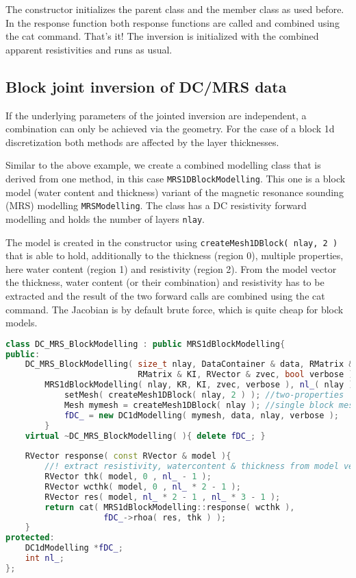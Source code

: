 The constructor initializes the parent class and the member class as used before.
In the response function both response functions are called and combined using the cat command.
That's it! The inversion is initialized with the combined apparent resistivities and runs as usual.

\subsection{Block joint inversion of DC/MRS data}\label{sec:blockjoint}
If the underlying parameters of the jointed inversion are independent, a combination can only be achieved via the geometry.
For the case of a block 1d discretization both methods are affected by the layer thicknesses.

Similar to the above example, we create a combined modelling class that is derived from one method, in this case \lstinline|MRS1DBlockModelling|.
This one is a block model (water content and thickness) variant of the magnetic resonance sounding (MRS) modelling \lstinline|MRSModelling|.
The class has a DC resistivity forward modelling and holds the number of layers \lstinline|nlay|.

The model is created in the constructor using \lstinline|createMesh1DBlock( nlay, 2 )| that is able to hold, additionally to the thickness (region 0), multiple properties, here water content (region 1) and resistivity (region 2).
From the model vector the thickness, water content (or their combination) and resistivity has to be extracted and the result of the two forward calls are combined using the cat command.
The Jacobian is by default brute force, which is quite cheap for block models.

\begin{lstlisting}[language=C++,morekeywords={RVector,RMatrix}]
class DC_MRS_BlockModelling : public MRS1dBlockModelling{
public:
    DC_MRS_BlockModelling( size_t nlay, DataContainer & data, RMatrix & KR,
                           RMatrix & KI, RVector & zvec, bool verbose ) :
        MRS1dBlockModelling( nlay, KR, KI, zvec, verbose ), nl_( nlay ) { 
            setMesh( createMesh1DBlock( nlay, 2 ) ); //two-properties
            Mesh mymesh = createMesh1DBlock( nlay ); //single block mesh
            fDC_ = new DC1dModelling( mymesh, data, nlay, verbose );
        }
    virtual ~DC_MRS_BlockModelling( ){ delete fDC_; }
    
    RVector response( const RVector & model ){
        //! extract resistivity, watercontent & thickness from model vec
        RVector thk( model, 0 , nl_ - 1 );
        RVector wcthk( model, 0 , nl_ * 2 - 1 );
        RVector res( model, nl_ * 2 - 1 , nl_ * 3 - 1 );
        return cat( MRS1dBlockModelling::response( wcthk ), 
                    fDC_->rhoa( res, thk ) );
    }
protected:
    DC1dModelling *fDC_;
    int nl_;
};
\end{lstlisting}

